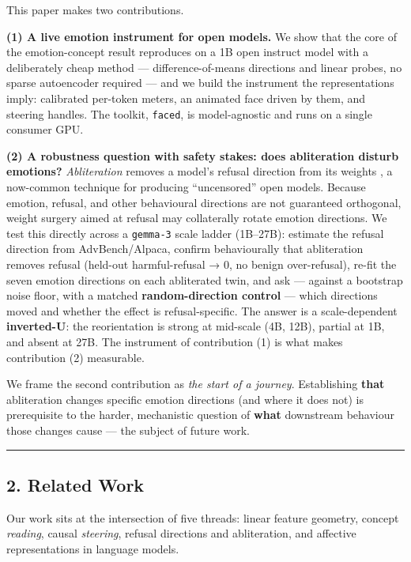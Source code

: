 \documentclass[
]{article}
\begin{document}
This paper makes two contributions.

\textbf{(1) A live emotion instrument for open models.} We show that the
core of the emotion-concept result reproduces on a 1B open instruct
model with a deliberately cheap method --- difference-of-means
directions and linear probes, no sparse autoencoder required --- and we
build the instrument the representations imply: calibrated per-token
meters, an animated face driven by them, and steering handles. The
toolkit, \texttt{faced}, is model-agnostic and runs on a single consumer
GPU.

\textbf{(2) A robustness question with safety stakes: does abliteration
disturb emotions?} \emph{Abliteration} removes a model's refusal
direction from its weights \citep{arditi2024refusal}, a now-common
technique for producing ``uncensored'' open models. Because emotion,
refusal, and other behavioural directions are not guaranteed orthogonal,
weight surgery aimed at refusal may collaterally rotate emotion
directions. We test this directly across a \texttt{gemma-3} scale ladder
(1B--27B): estimate the refusal direction from AdvBench/Alpaca, confirm
behaviourally that abliteration removes refusal (held-out
harmful-refusal → 0, no benign over-refusal), re-fit the seven emotion
directions on each abliterated twin, and ask --- against a bootstrap
noise floor, with a matched \textbf{random-direction control} --- which
directions moved and whether the effect is refusal-specific. The answer
is a scale-dependent \textbf{inverted-U}: the reorientation is strong at
mid-scale (4B, 12B), partial at 1B, and absent at 27B. The instrument of
contribution (1) is what makes contribution (2) measurable.

We frame the second contribution as \emph{the start of a journey}.
Establishing \textbf{that} abliteration changes specific emotion
directions (and where it does not) is prerequisite to the harder,
mechanistic question of \textbf{what} downstream behaviour those changes
cause --- the subject of future work.

\begin{center}\rule{0.5\linewidth}{0.5pt}\end{center}

\subsection{2. Related Work}\label{related-work}

Our work sits at the intersection of five threads: linear feature
geometry, concept \emph{reading}, causal \emph{steering}, refusal
directions and abliteration, and affective representations in language
models.
\end{document}
